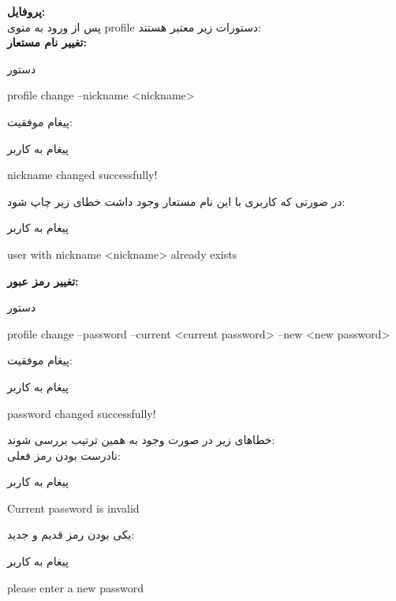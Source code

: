 \documentclass[]{article}
\begin{document}
\vspace{.5cm}
\textbf{پروفایل:}
\\
پس از ورود به منوی profile دستورات زیر معتبر هستند:
\\
\vspace{.5cm}
\textbf{تغییر نام مستعار:}
\begin{mybox}[colback=yellow]{دستور}
	\begin{latin}	
		profile change --nickname <nickname>
	\end{latin}
\end{mybox}
پیغام موفقیت:
\begin{mybox}[colback=yellow]{پیغام به کاربر}
	\begin{latin}	
		nickname changed successfully!
	\end{latin}
\end{mybox}
در صورتی که کاربری با این نام مستعار وجود داشت خطای زیر چاپ شود:
\begin{mybox}[colback=yellow]{پیغام به کاربر}
	\begin{latin}	
		user with nickname <nickname> already exists
	\end{latin}
\end{mybox}

\vspace{.5cm}
\textbf{تغییر رمز عبور:}
\begin{mybox}[colback=yellow]{دستور}
	\begin{latin}	
		profile change --password --current <current password> --new <new 
		password>
	\end{latin}
\end{mybox}
پیغام موفقیت:
\begin{mybox}[colback=yellow]{پیغام به کاربر}
	\begin{latin}	
		password changed successfully!
	\end{latin}
\end{mybox}
خطا‌های زیر در صورت وجود به همین ترتیب بررسی شوند:
\\
نادرست بودن رمز فعلی:
\begin{mybox}[colback=yellow]{پیغام به کاربر}
	\begin{latin}	
		Current password is invalid
	\end{latin}
\end{mybox}
یکی بودن رمز قدیم و جدید:
\begin{mybox}[colback=yellow]{پیغام به کاربر}
	\begin{latin}	
		please enter a new password
	\end{latin}
\end{mybox}
\end{document}
